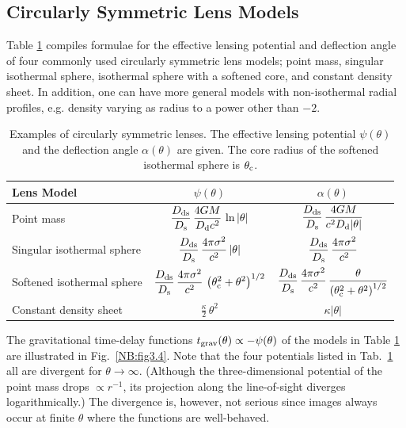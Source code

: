 \documentclass[a4paper,10pt]{article} %
\begin{document}
\subsection{Circularly Symmetric Lens Models}
\label{NB:subsect3.4}

Table \ref{NB:tab3.1} compiles formulae for the effective lensing
potential and deflection angle of four commonly used circularly
symmetric lens models; point mass, singular isothermal sphere,
isothermal sphere with a softened core, and constant density sheet. In
addition, one can have more general models with non-isothermal radial
profiles, e.g. density varying as radius to a power other than $-2$.

\begin{table}
  \caption{Examples of circularly symmetric lenses. The effective
  lensing potential $\psi(\theta)$ and the deflection angle
  $\alpha(\theta)$ are given. The core radius of the softened
  isothermal sphere is $\theta_{\rm c}$.}
\medskip %
  \begin{center}
  \begin{tabular}{|l|cc|}
  \hline\hline
    Lens Model & $\psi(\theta)$ & $\alpha(\theta)$ \\
  \hline\hline
    Point mass &
    $\displaystyle{\frac{D_{\rm ds}}{D_{\rm s}}\,
      \frac{4GM}{D_{\rm d}c^2}\,\ln|\theta|}$ &
    $\displaystyle{\frac{D_{\rm ds}}{D_{\rm s}}\,
      \frac{4GM}{c^2D_{\rm d}|\theta|}}$ \\
  \hline
    Singular isothermal sphere &
    $\displaystyle{\frac{D_{\rm ds}}{D_{\rm s}}\,
      \frac{4\pi\sigma^2}{c^2}\,|\theta|}$ &
    $\displaystyle{\frac{D_{\rm ds}}{D_{\rm s}}\,
      \frac{4\pi\sigma^2}{c^2}}$ \\
  \hline
    Softened isothermal sphere &
    $\displaystyle{\frac{D_{\rm ds}}{D_{\rm s}}\,
      \frac{4\pi\sigma^2}{c^2}\,
      \left(\theta_{\rm c}^2+\theta^2\right)^{1/2}}$ &
    $\displaystyle{\frac{D_{\rm ds}}{D_{\rm s}}\,
      \frac{4\pi\sigma^2}{c^2}\,\frac{\theta}
      {\left(\theta_{\rm c}^2+\theta^2\right)^{1/2}}}$ \\
  \hline
    Constant density sheet &
    $\displaystyle{\frac{\kappa}{2}\,\theta^2}$ &
    $\displaystyle{\kappa|\theta|}$ \\
  \hline\hline
  \end{tabular}
  \end{center}
\label{NB:tab3.1}
\end{table}

The gravitational time-delay functions $t_{\rm
grav}(\theta)\propto-\psi(\theta)$ of the models in Table
\ref{NB:tab3.1} are illustrated in Fig.\ \ref{NB:fig3.4}. Note that
the four potentials listed in Tab.\ \ref{NB:tab3.1} all are divergent
for $\theta\to\infty$. (Although the three-dimensional potential of
the point mass drops $\propto r^{-1}$, its projection along the
line-of-sight diverges logarithmically.) The divergence is, however,
not serious since images always occur at finite $\theta$ where the
functions are well-behaved.
\end{document}
